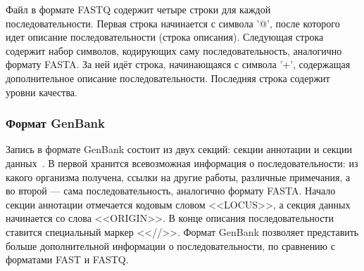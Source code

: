 \indent Файл в формате FASTQ содержит четыре строки для каждой последовательности. Первая строка начинается с символа '@', после которого идет описание последовательности (строка описания). Следующая строка содержит набор символов, кодирующих саму последовательность, аналогично формату FASTA. За ней идёт строка, начинающаяся с символа '+', содержащая дополнительное описание последовательности. Последняя строка содержит уровни качества. 

\subsubsection[Формат GenBank]{\large Формат GenBank}
\hspace{\parindent} Запись в формате GenBank состоит из двух секций: секции аннотации и секции данных~\cite{GenBankFormat}. В первой хранится всевозможная информация о последовательности: из какого организма получена, ссылки на другие работы, различные примечания, а во второй --- сама последовательность, аналогично формату FASTA. Начало секции аннотации отмечается кодовым словом <<LOCUS>>, а секция данных начинается со слова <<ORIGIN>>. В конце описания последовательности ставится специальный маркер <<//>>. Формат GenBank позволяет представить больше дополнительной информации о последовательности, по сравнению с форматами FAST и FASTQ.
